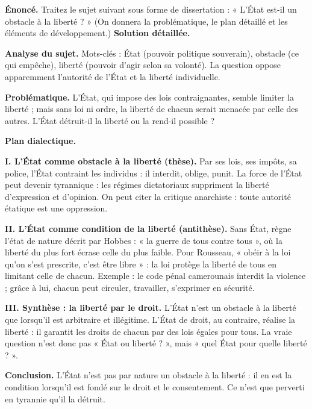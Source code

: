 \documentclass[11pt]{article}
\newcommand{\cle}[1]{{\popxbold\color{popdark}#1}}
\begin{document}
\begin{exoresolu}
\textbf{Énoncé.} Traitez le sujet suivant sous forme de dissertation : « L'État est-il un obstacle à la liberté ? » (On donnera la problématique, le plan détaillé et les éléments de développement.)
\tcblower
\textbf{Solution détaillée.}

\textbf{Analyse du sujet.} Mots-clés : \cle{État} (pouvoir politique souverain), \cle{obstacle} (ce qui empêche), \cle{liberté} (pouvoir d'agir selon sa volonté). La question oppose apparemment l'autorité de l'État et la liberté individuelle.

\textbf{Problématique.} L'État, qui impose des lois contraignantes, semble limiter la liberté ; mais sans loi ni ordre, la liberté de chacun serait menacée par celle des autres. L'État détruit-il la liberté ou la rend-il possible ?

\textbf{Plan dialectique.}

\textbf{I. L'État comme obstacle à la liberté (thèse).}
Par ses lois, ses impôts, sa police, l'État contraint les individus : il interdit, oblige, punit. La force de l'État peut devenir tyrannique : les régimes dictatoriaux suppriment la liberté d'expression et d'opinion. On peut citer la critique anarchiste : toute autorité étatique est une oppression.

\textbf{II. L'État comme condition de la liberté (antithèse).}
Sans État, règne l'état de nature décrit par \cle{Hobbes} : « la guerre de tous contre tous », où la liberté du plus fort écrase celle du plus faible. Pour \cle{Rousseau}, « obéir à la loi qu'on s'est prescrite, c'est être libre » : la loi protège la liberté de tous en limitant celle de chacun. Exemple : le code pénal camerounais interdit la violence ; grâce à lui, chacun peut circuler, travailler, s'exprimer en sécurité.

\textbf{III. Synthèse : la liberté par le droit.}
L'État n'est un obstacle à la liberté que lorsqu'il est arbitraire et illégitime. L'\cle{État de droit}, au contraire, réalise la liberté : il garantit les droits de chacun par des lois égales pour tous. La vraie question n'est donc pas « État ou liberté ? », mais « quel État pour quelle liberté ? ».

\textbf{Conclusion.} L'État n'est pas par nature un obstacle à la liberté : il en est la condition lorsqu'il est fondé sur le droit et le consentement. Ce n'est que perverti en tyrannie qu'il la détruit.
\end{exoresolu}
\end{document}

